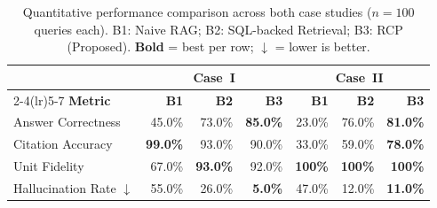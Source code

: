 \documentclass[largeformat]{interact}
\begin{document}
\begin{table}[h]
    \centering
    \caption{Quantitative performance comparison across both case studies ($n = 100$ queries each). B1: Naive RAG; B2: SQL-backed Retrieval; B3: RCP (Proposed). \textbf{Bold} = best per row; $\downarrow$ = lower is better.}
    \label{tab:performance_combined}
    \small
    \setlength{\tabcolsep}{5pt}
    \renewcommand{\arraystretch}{1.1}
    \begin{tabular}{@{}lrrrrrr@{}}
        \toprule
        & \multicolumn{3}{c}{\textbf{Case~I}} & \multicolumn{3}{c}{\textbf{Case~II}} \\
        \cmidrule(lr){2-4}\cmidrule(lr){5-7}
        \textbf{Metric} & \textbf{B1} & \textbf{B2} & \textbf{B3} & \textbf{B1} & \textbf{B2} & \textbf{B3} \\
        \midrule
        Answer Correctness              & 45.0\% & 73.0\% & \textbf{85.0\%} & 23.0\% & 76.0\% & \textbf{81.0\%} \\
        Citation Accuracy               & \textbf{99.0\%} & 93.0\% & 90.0\% & 33.0\% & 59.0\% & \textbf{78.0\%} \\
        Unit Fidelity                   & 67.0\% & \textbf{93.0\%} & 92.0\% & \textbf{100\%} & \textbf{100\%} & \textbf{100\%} \\
        Hallucination Rate $\downarrow$ & 55.0\% & 26.0\% & \textbf{5.0\%} & 47.0\% & 12.0\% & \textbf{11.0\%} \\
        \bottomrule
    \end{tabular}
\end{table}

    
\end{document}
